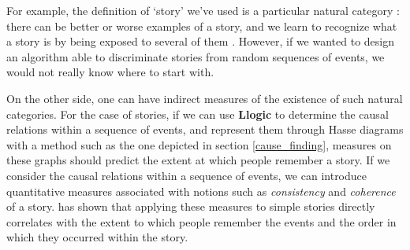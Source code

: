 \documentclass[
		twoside,openright,titlepage,numbers=noenddot,manychapters,
		headinclude,%
                footinclude=false,cleardoublepage=empty,
                BCOR=5mm,
		fontsize=11pt, %
                 enabledeprecatedfontcommands]{scrreprt}
\begin{document}
 For example, the definition of `story' we've used is a particular natural category \cite[]{stein1982ds}: there can be better or worse examples of a story, and we learn to recognize what a story is by being exposed to several of them \cite[]{stein1984csc}. However, if we wanted to design an algorithm able to discriminate stories from random sequences of events, we would not really know where to start with.

On the other side, one can have indirect measures of the existence of such natural categories. For the case of stories, if we can use \textbf{Llogic} to determine the causal relations within a sequence of events, and represent them through Hasse diagrams with a method such as the one depicted in section  \ref{cause_finding}, measures on these graphs should predict the extent at which people remember a story.
If we consider the causal relations within a sequence of events, we can introduce quantitative measures associated with notions such as \emph{consistency} and \emph{coherence} of a story.
 \cite{trabasso1982cca} has shown that applying these measures to simple stories directly correlates with the extent to which people remember the events and the order in which they occurred within the story.


\end{document}
